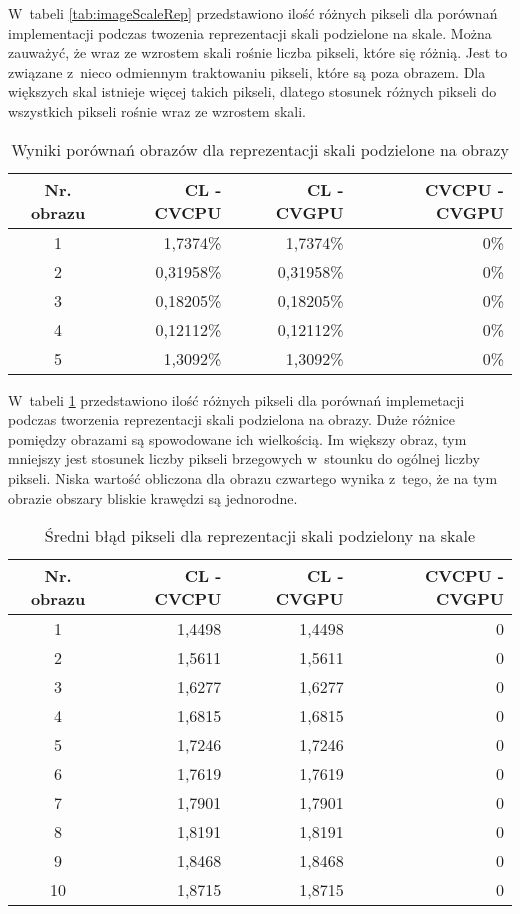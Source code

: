 W~tabeli \ref{tab:imageScaleRep} przedstawiono ilość różnych pikseli dla porównań implementacji podczas twozenia reprezentacji skali podzielone na skale. Można zauważyć, że wraz ze wzrostem skali rośnie liczba pikseli, które się różnią. Jest to związane z~nieco odmiennym traktowaniu pikseli, które są poza obrazem. Dla większych skal istnieje więcej takich pikseli, dlatego stosunek różnych pikseli do wszystkich pikseli rośnie wraz ze wzrostem skali.

\begin{center}
\begin{table}
\centering
\caption{Wyniki porównań obrazów dla reprezentacji skali podzielone na obrazy}
\label{tab:imageImageRep}
\begin{tabular}{|c|r|r|r|}
\hline
Nr. obrazu & CL - CVCPU & CL - CVGPU & CVCPU - CVGPU \\ \hline
1 & 1,7374\% & 1,7374\% & 0\% \\ \hline
2 & 0,31958\% & 0,31958\% & 0\% \\ \hline
3 & 0,18205\% & 0,18205\% & 0\% \\ \hline
4 & 0,12112\% & 0,12112\% & 0\% \\ \hline
5 & 1,3092\% & 1,3092\% & 0\% \\ \hline
\end{tabular}
\end{table}
\end{center}

W~tabeli \ref{tab:imageImageRep} przedstawiono ilość różnych pikseli dla porównań implemetacji podczas tworzenia reprezentacji skali podzielona na obrazy. Duże różnice pomiędzy obrazami są spowodowane ich wielkością. Im większy obraz, tym mniejszy jest stosunek liczby pikseli brzegowych w~stounku do ogólnej liczby pikseli. Niska wartość obliczona dla obrazu czwartego wynika z~tego, że na tym obrazie obszary bliskie krawędzi są jednorodne.

\begin{center}
\begin{table}
\centering
\caption{Średni błąd pikseli dla reprezentacji skali podzielony na skale}
\label{tab:devScaleRep}
\begin{tabular}{|c|r|r|r|}
\hline
Nr. obrazu & CL - CVCPU & CL - CVGPU & CVCPU - CVGPU \\ \hline
1 & 1,4498 & 1,4498 & 0 \\ \hline
2 & 1,5611 & 1,5611 & 0 \\ \hline
3 & 1,6277 & 1,6277 & 0 \\ \hline
4 & 1,6815 & 1,6815 & 0 \\ \hline
5 & 1,7246 & 1,7246 & 0 \\ \hline
6 & 1,7619 & 1,7619 & 0 \\ \hline
7 & 1,7901 & 1,7901 & 0 \\ \hline
8 & 1,8191 & 1,8191 & 0 \\ \hline
9 & 1,8468 & 1,8468 & 0 \\ \hline
10 & 1,8715 & 1,8715 & 0 \\ \hline
\end{tabular}
\end{table}
\end{center}

